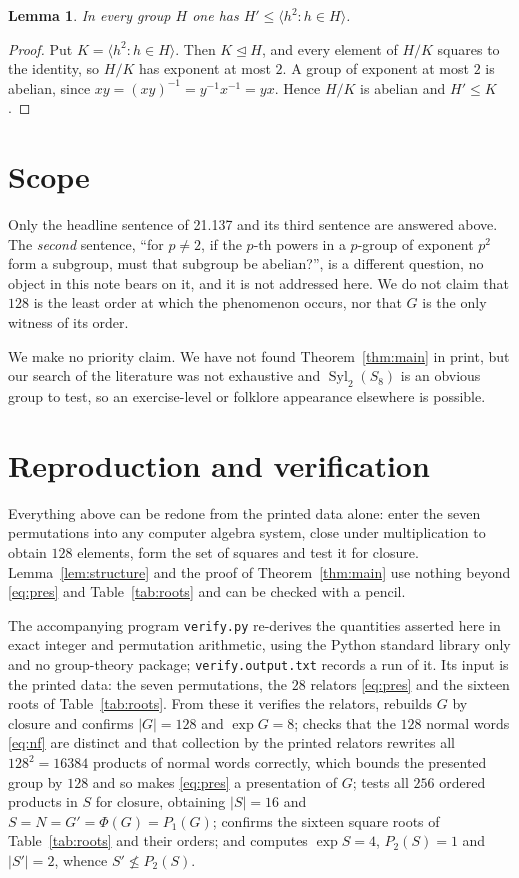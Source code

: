 \documentclass[11pt]{amsart}
\newtheorem{lemma}[theorem]{Lemma}
\theoremstyle{remark}
\DeclareMathOperator{\Syl}{Syl}
\begin{document}
\begin{lemma}\label{lem:vacuous}
In every group $H$ one has $H'\le\langle h^2:h\in H\rangle$.
\end{lemma}

\begin{proof}
Put $K=\langle h^2:h\in H\rangle$. Then $K\trianglelefteq H$, and every element of $H/K$
squares to the identity, so $H/K$ has exponent at most $2$. A group of exponent at most $2$
is abelian, since $xy=(xy)^{-1}=y^{-1}x^{-1}=yx$. Hence $H/K$ is abelian and $H'\le K$.
\end{proof}

\section{Scope}

Only the headline sentence of 21.137 and its third sentence are answered above. The
\emph{second} sentence, ``for $p\ne2$, if the $p$-th powers in a $p$-group of exponent $p^2$
form a subgroup, must that subgroup be abelian?'', is a different question, no object in
this note bears on it, and it is not addressed here. We do not claim that $128$ is the least
order at which the phenomenon occurs, nor that $G$ is the only witness of its order.

We make no priority claim. We have not found Theorem~\ref{thm:main} in print, but our
search of the literature was not exhaustive and $\Syl_2(S_8)$ is an obvious group to test,
so an exercise-level or folklore appearance elsewhere is possible.

\section{Reproduction and verification}

Everything above can be redone from the printed data alone: enter the seven permutations
into any computer algebra system, close under multiplication to obtain $128$ elements, form
the set of squares and test it for closure. Lemma~\ref{lem:structure} and the proof of
Theorem~\ref{thm:main} use nothing beyond \eqref{eq:pres} and Table~\ref{tab:roots} and can
be checked with a pencil.

The accompanying program \texttt{verify.py} re-derives the quantities asserted here in exact
integer and permutation arithmetic, using the Python standard library only and no
group-theory package; \texttt{verify.output.txt} records a run of it. Its input is the
printed data: the seven permutations, the $28$ relators \eqref{eq:pres} and the sixteen
roots of Table~\ref{tab:roots}. From these it verifies the relators, rebuilds $G$ by closure
and confirms $|G|=128$ and $\exp G=8$; checks that the $128$ normal words \eqref{eq:nf} are
distinct and that collection by the printed relators rewrites all $128^2=16384$ products of
normal words correctly, which bounds the presented group by $128$ and so makes
\eqref{eq:pres} a presentation of $G$; tests all $256$ ordered products in $S$ for closure,
obtaining $|S|=16$ and $S=N=G'=\Phi(G)=P_1(G)$; confirms the sixteen square roots of
Table~\ref{tab:roots} and their orders; and computes $\exp S=4$, $P_2(S)=1$ and $|S'|=2$,
whence $S'\not\le P_2(S)$.
\end{document}
